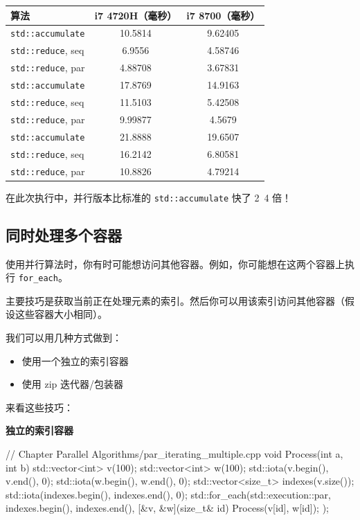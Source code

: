 \begin{table}[H]
\centering
\begin{tabularx}{\textwidth}{X c c}
\toprule
算法 & i7 4720H（毫秒） & i7 8700（毫秒） \\
\midrule
\texttt{std::accumulate} & 10.5814 & 9.62405 \\
\texttt{std::reduce}, seq & 6.9556 & 4.58746 \\
\texttt{std::reduce}, par & 4.88708 & 3.67831 \\
\texttt{std::accumulate} & 17.8769 & 14.9163 \\
\texttt{std::reduce}, seq & 11.5103 & 5.42508 \\
\texttt{std::reduce}, par & 9.99877 & 4.5679 \\
\texttt{std::accumulate} & 21.8888 & 19.6507 \\
\texttt{std::reduce}, seq & 16.2142 & 6.80581 \\
\texttt{std::reduce}, par & 10.8826 & 4.79214 \\
\bottomrule
\end{tabularx}
\end{table}


在此次执行中，并行版本比标准的 \texttt{std::accumulate} 快了 2~4 倍！


\subsection{同时处理多个容器}

使用并行算法时，你有时可能想访问其他容器。例如，你可能想在这两个容器上执行 \texttt{for\_each}。

主要技巧是获取当前正在处理元素的索引。然后你可以用该索引访问其他容器（假设这些容器大小相同）。

我们可以用几种方式做到：
\begin{itemize}
\item 使用一个独立的索引容器
\item 使用 zip 迭代器/包装器
\end{itemize}

来看这些技巧：

\textbf{独立的索引容器}

\begin{codebox}[cpp]
// Chapter Parallel Algorithms/par_iterating_multiple.cpp
void Process(int a, int b) { }
std::vector<int> v(100);
std::vector<int> w(100);
std::iota(v.begin(), v.end(), 0);
std::iota(w.begin(), w.end(), 0);
std::vector<size_t> indexes(v.size());
std::iota(indexes.begin(), indexes.end(), 0);
std::for_each(std::execution::par, indexes.begin(), indexes.end(),
[&v, &w](size_t& id) {
Process(v[id], w[id]);
}
);
\end{codebox}

